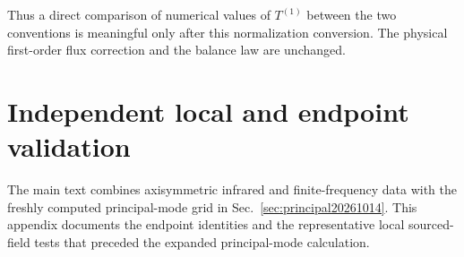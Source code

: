 \documentclass[aps,prd,twocolumn,10pt,nofootinbib,superscriptaddress,floatfix]{revtex4-2}
\begin{document}
Thus a direct comparison of numerical values of $T^{(1)}$ between the two
conventions is meaningful only after this normalization conversion.  The physical
first-order flux correction and the balance law are unchanged.


\section{Independent local and endpoint validation}
\label{app:validation20261008}

The main text combines axisymmetric infrared and finite-frequency data with
the freshly computed principal-mode grid in
Sec.~\ref{sec:principal20261014}.  This appendix documents the endpoint
identities and the representative local sourced-field tests that preceded
the expanded principal-mode calculation.
\end{document}
